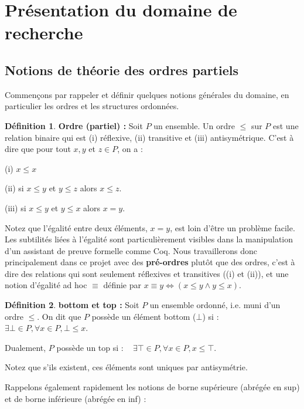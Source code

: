 \documentclass{article}
\theoremstyle{definition}
\newtheorem{definition}{Définition}[section]
\begin{document}
\tableofcontents



\section{Présentation du domaine de recherche}


\subsection{Notions de théorie des ordres partiels}

Commençons par rappeler et définir quelques notions générales du domaine, en particulier les ordres et les structures ordonnées.

\begin{definition}{\textbf{Ordre (partiel) : }}
Soit $P$ un ensemble. Un ordre $\leq$ sur $P$ est une relation binaire qui est (i) réflexive, (ii) transitive et (iii) antisymétrique. C'est à dire que pour tout $x, y$ et $z \in P$, on a :

(i) $x \leq x$

(ii) si $x \leq y$ et $y \leq z$ alors $x \leq z$.

(iii) si $x \leq y$ et $y \leq x$ alors $x = y$.
\end{definition}

Notez que l'égalité entre deux éléments, $x = y$, est loin d'être un problème facile. Les subtilités liées à l'égalité sont particulièrement visibles dans la manipulation d'un assistant de preuve formelle comme Coq. Nous travaillerons donc principalement dans ce projet avec des \textbf{pré-ordres} plutôt que des ordres, c'est à dire des relations qui sont seulement réflexives et transitives ((i) et (ii)), et une notion d'égalité ad hoc $\equiv$ définie par $x \equiv y \Longleftrightarrow (x \leq y \wedge y \leq x)$.

\begin{definition}{\textbf{bottom et top : }}
Soit $P$ un ensemble ordonné, i.e. muni d'un ordre $\leq$. On dit que $P$ possède un élément bottom ($\bot$) si : ~ $\exists \bot \in P, \forall x \in P, \bot \leq x$.

\noindent Dualement, $P$ possède un top si : ~ $\exists \top \in P, \forall x \in P, x \leq \top$.

Notez que s'ils existent, ces éléments sont uniques par antisymétrie.
\end{definition}

Rappelons également rapidement les notions de borne supérieure (abrégée en sup) et de borne inférieure (abrégée en inf) :
\end{document}

